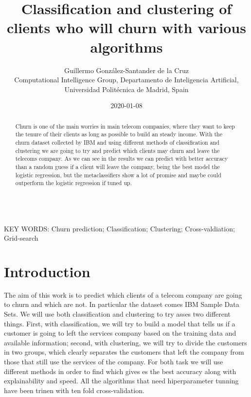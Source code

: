 \documentclass[a4paper,11pt]{article}
\begin{document}
\title{Classification and clustering of clients who will churn with various algorithms}

\author{{Guillermo González-Santander de la Cruz}\\
{\small Computational Intelligence Group, Departamento de Inteligencia Artificial, Universidad Politécnica de Madrid, Spain}}

\date{2020-01-08}
\maketitle



\begin{abstract}
Churn is one of the main worries in main telecom companies, where they want to keep the tenure of their clients as long as possible to build an steady income. With the churn dataset collected by IBM and using different methods of classification and clustering we are going to try and predict which clients may churn and leave the telecoms company.
As we can see in the results we can predict with better accuracy than a random guess if a client will leave the company, being the best model the logistic regression, but the metaclassifiers show a lot of promise and maybe could outperform the logistic regression if tuned up.
\end{abstract}


\ \\
KEY WORDS: Churn prediction; Classification; Clustering; Cross-valdiation; Grid-search

\section{Introduction}

The aim of this work is to predict which clients of a telecom company are going to churn and which are not. In particular the dataset comes IBM Sample Data Sets.
We will use both classification and clustering to try asses two different things. First, with classification, we will try to build a model that tells us if a customer is going to left the services company based on the training data and available information; second, with clustering, we will try to divide the customers in two groups, which clearly separates the customers that left the company from those that still use the services of the company.
For both task we will use different methods in order to find which gives es the best accuracy along with explainability and speed.
All the algorithms that need hiperparameter tunning have been trinen with ten fold cross-validation.
\end{document}
